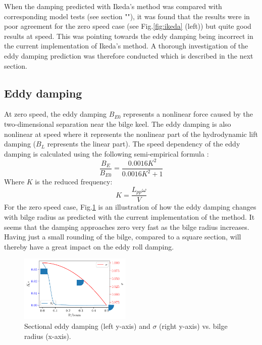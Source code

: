 When the damping predicted with Ikeda's method was compared with
corresponding model tests (see section ""), it
was found that the results were in poor agreement for the zero speed
case (see Fig.\ref{fig:ikeda} (left)) but quite good results at
speed. This was pointing towards the eddy damping being incorrect in the
current implementation of Ikeda's method. A thorough investigation of
the eddy damping prediction was therefore conducted which is described
in the next section.
\subsection*{Eddy damping}\label{eddy-damping}
At zero speed, the eddy damping $B_{E0}$ represents a nonlinear force
caused by the two-dimensional separation near the bilge keel. The eddy
damping is also nonlinear at speed where it represents the nonlinear
part of the hydrodynamic lift damping ($B_L$ represents the linear
part). The speed dependency of the eddy damping is calculated using the
following semi-empirical formula \citep{7505983/937PN5DT}:
\begin{equation}
\frac{B_{E}}{B_{E0}} = \frac{0.0016 K^{2}}{0.0016 K^{2} + 1}
\label{eq:eddy_speed}
\end{equation}
Where $K$ is the reduced frequency:
\begin{equation}
K = \frac{L_{pp} \omega}{V}
\label{eq:K}
\end{equation}
For the zero speed case, Fig.\ref{fig:eddy_sigma} is an
illustration of how the eddy damping changes with bilge radius as
predicted with the current implementation of the method. It seems that
the damping approaches zero very fast as the bilge radius increases.
Having just a small rounding of the bilge, compared to a square section,
will thereby have a great impact on the eddy roll damping.
\begin{figure}[H]
\begin{center}\includegraphics[width = 0.475\textwidth]{figures/eddy_sigma.pdf}\end{center}
\vspace{-0.7cm}
\caption{Sectional eddy damping (left y-axis) and $\sigma$ (right y-axis) vs. bilge radius (x-axis).}
\label{fig:eddy_sigma}
\end{figure}
